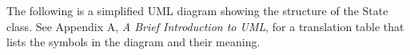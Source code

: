 

The following is a simplified UML diagram showing the structure of the
State class.  See Appendix A, {\it A Brief Introduction to UML},
for a translation table that lists the symbols in the diagram and their 
meaning.


